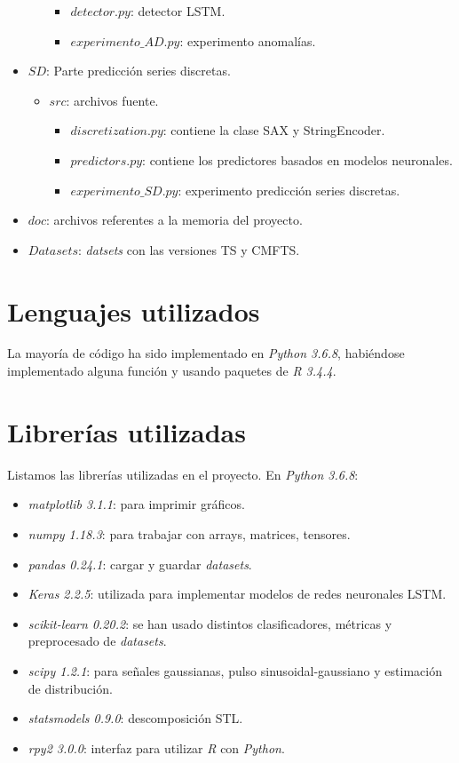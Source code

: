 \begin{itemize}
\begin{itemize}
\begin{itemize}
          \item $detector.py$: detector LSTM.
          \item $experimento\_AD.py$: experimento anomalías.
        \end{itemize}
    \end{itemize}
  \item $SD$: Parte predicción series discretas.
    {\begin{itemize}
      \item $src$: archivos fuente.
      \begin{itemize}
        \item $discretization.py$: contiene la clase SAX y StringEncoder.
        \item $predictors.py$: contiene los predictores basados en modelos neuronales.
        \item $experimento\_SD.py$: experimento predicción series discretas.
      \end{itemize}
    \end{itemize}}
  \item $doc$: archivos referentes a la memoria del proyecto.
  \item $Datasets$: \emph{datsets} con las versiones TS y CMFTS.

\end{itemize}

\section{Lenguajes utilizados}

La mayoría de código ha sido implementado en \emph{Python 3.6.8}, habiéndose implementado alguna función y usando paquetes de \emph{R 3.4.4}.

\section{Librerías utilizadas}

Listamos las librerías utilizadas en el proyecto. En \emph{Python 3.6.8}:

\begin{itemize}
  \item \emph{matplotlib 3.1.1}: para imprimir gráficos.
  \item \emph{numpy 1.18.3}: para trabajar con arrays, matrices, tensores.
  \item \emph{pandas 0.24.1}: cargar y guardar \emph{datasets}.
  \item \emph{Keras 2.2.5}: utilizada para implementar modelos de redes neuronales LSTM.
  \item \emph{scikit-learn 0.20.2}: se han usado distintos clasificadores, métricas y preprocesado de \emph{datasets}.
  \item \emph{scipy 1.2.1}: para señales gaussianas, pulso sinusoidal-gaussiano y estimación de distribución.
  \item \emph{statsmodels 0.9.0}: descomposición STL.
  \item \emph{rpy2 3.0.0}: interfaz para utilizar \emph{R} con \emph{Python}.
\end{itemize}


